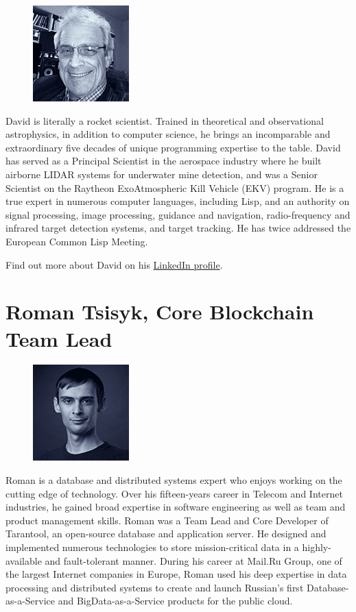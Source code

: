 \documentclass[8pt,fleqn,openany]{book}
\begin{document}
{
\setlength\intextsep{0pt}
\begin{figure}
	\includegraphics{images/team/team-3.png}
\end{figure}

David is literally a rocket scientist. Trained in theoretical and observational astrophysics, in addition to computer science, he brings an incomparable and extraordinary five decades of unique programming expertise to the table. David has served as a Principal Scientist in the aerospace industry where he built airborne LIDAR systems for underwater mine detection, and was a Senior Scientist on the Raytheon ExoAtmospheric Kill Vehicle (EKV) program. He is a true expert in numerous computer languages, including Lisp, and an authority on signal processing, image processing, guidance and navigation, radio-frequency and infrared target detection systems, and target tracking. He has twice addressed the European Common Lisp Meeting. 

Find out more about David on his \href{https://www.linkedin.com/in/david-mcclain-685669155/}{LinkedIn profile}.

\section{Roman Tsisyk, Core Blockchain Team Lead}

{
\setlength\intextsep{0pt}
\begin{figure}
	\includegraphics{images/team/team-4.png}
\end{figure}

Roman is a database and distributed systems expert who enjoys working on the cutting edge of technology. Over his fifteen-years career in Telecom and Internet industries, he gained broad expertise in software engineering as well as team and product management skills. Roman was a Team Lead and Core Developer of Tarantool, an open-source database and application server. He designed and implemented numerous technologies to store mission-critical data in a highly-available and fault-tolerant manner. During his career at Mail.Ru Group, one of the largest Internet companies in Europe, Roman used his deep expertise in data processing and distributed systems to create and launch Russian’s first Database-as-a-Service and BigData-as-a-Service products for the public cloud. 

}}
\end{document}
